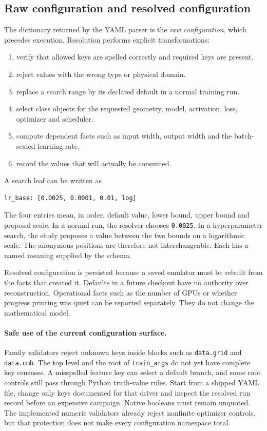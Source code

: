 \documentclass[10pt,aps,prd,twocolumn,nofootinbib]{revtex4-2}
\newcommand{\code}[1]{\texttt{#1}}
\begin{document}
\subsection{Raw configuration and resolved configuration}

The dictionary returned by the YAML parser is the \emph{raw configuration},
which precedes execution.  Resolution performs explicit transformations:
\begin{enumerate}
  \item verify that allowed keys are spelled correctly and required keys are
        present.
  \item reject values with the wrong type or physical domain.
  \item replace a search range by its declared default in a normal training
        run.
  \item select class objects for the requested geometry, model, activation,
        loss, optimizer and scheduler.
  \item compute dependent facts such as input width, output width and the
        batch-scaled learning rate.
  \item record the values that will actually be consumed.
\end{enumerate}

A search leaf can be written as
\begin{verbatim}
lr_base: [0.0025, 0.0001, 0.01, log]
\end{verbatim}
The four entries mean, in order, default value, lower bound, upper bound and
proposal scale.  In a normal run, the resolver chooses \code{0.0025}.  In a
hyperparameter search, the study proposes a value between the two bounds on a
logarithmic scale.  The anonymous positions are therefore not interchangeable.
Each has a named meaning supplied by the schema.

Resolved configuration is persisted because a saved emulator must be rebuilt
from the facts that created it.  Defaults in a future checkout have no authority
over reconstruction.  Operational facts such as the number of GPUs or whether
progress printing was quiet can be reported separately.  They do not change
the mathematical model.

\paragraph{Safe use of the current configuration surface.}
Family validators reject unknown keys inside blocks such as
\code{data.grid} and \code{data.cmb}.  The top level and the root of
\code{train\_args} do not yet have complete key censuses.  A misspelled feature
key can select a default branch, and some root controls still pass through
Python truth-value rules.  Start from a shipped YAML file, change only keys
documented for that driver and inspect the resolved run record before an
expensive campaign.  Native booleans must remain unquoted.  The implemented
numeric validators already reject nonfinite optimizer controls, but that
protection does not make every configuration namespace total.
\end{document}
